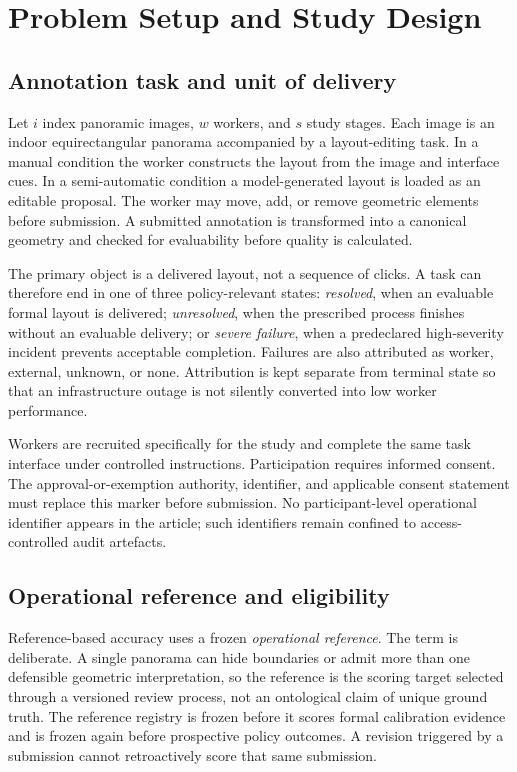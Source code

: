 \section{Problem Setup and Study Design}
\label{sec:setup}

\subsection{Annotation task and unit of delivery}

Let $i$ index panoramic images, $w$ workers, and $s$ study stages. Each image is an indoor equirectangular panorama accompanied by a layout-editing task. In a manual condition the worker constructs the layout from the image and interface cues. In a semi-automatic condition a model-generated layout is loaded as an editable proposal. The worker may move, add, or remove geometric elements before submission. A submitted annotation is transformed into a canonical geometry and checked for evaluability before quality is calculated.

The primary object is a delivered layout, not a sequence of clicks. A task can therefore end in one of three policy-relevant states: \emph{resolved}, when an evaluable formal layout is delivered; \emph{unresolved}, when the prescribed process finishes without an evaluable delivery; or \emph{severe failure}, when a predeclared high-severity incident prevents acceptable completion. Failures are also attributed as worker, external, unknown, or none. Attribution is kept separate from terminal state so that an infrastructure outage is not silently converted into low worker performance.

Workers are recruited specifically for the study and complete the same task interface under controlled instructions. Participation requires informed consent. \ethicsverify{} The approval-or-exemption authority, identifier, and applicable consent statement must replace this marker before submission. No participant-level operational identifier appears in the article; such identifiers remain confined to access-controlled audit artefacts.

\subsection{Operational reference and eligibility}

Reference-based accuracy uses a frozen \emph{operational reference}. The term is deliberate. A single panorama can hide boundaries or admit more than one defensible geometric interpretation, so the reference is the scoring target selected through a versioned review process, not an ontological claim of unique ground truth. The reference registry is frozen before it scores formal calibration evidence and is frozen again before prospective policy outcomes. A revision triggered by a submission cannot retroactively score that same submission.

